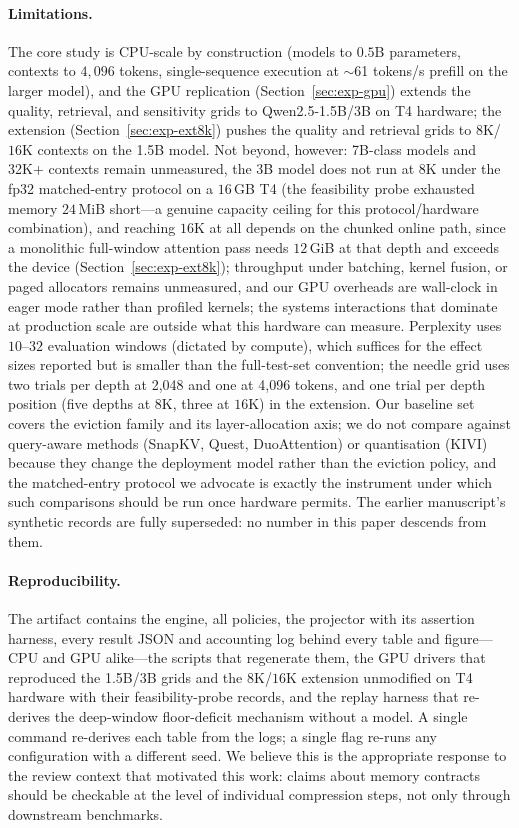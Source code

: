 \paragraph{Limitations.}
The core study is CPU-scale by construction (models to $0.5$B parameters,
contexts to $4{,}096$ tokens, single-sequence execution at
$\sim$61 tokens/s prefill on the larger model), and the GPU replication
(Section~\ref{sec:exp-gpu}) extends the quality, retrieval, and
sensitivity grids to Qwen2.5-1.5B/3B on T4 hardware; the extension
(Section~\ref{sec:exp-ext8k}) pushes the quality and retrieval grids to
$8$K/$16$K contexts on the 1.5B model. Not beyond, however: 7B-class
models and 32K+ contexts remain unmeasured, the 3B model does not run
at $8$K under the fp32 matched-entry protocol on a $16$\,GB T4 (the
feasibility probe exhausted memory $24$\,MiB short---a genuine capacity
ceiling for this protocol/hardware combination), and reaching $16$K at
all depends on the chunked online path, since a monolithic full-window
attention pass needs $12$\,GiB at that depth and exceeds the device
(Section~\ref{sec:exp-ext8k}); throughput under
batching, kernel fusion, or paged allocators remains unmeasured, and our
GPU overheads are wall-clock in eager mode rather than profiled kernels;
the systems interactions that dominate at production scale
\cite{kwon2023paged,mao2026infra} are outside what this hardware can
measure. Perplexity uses $10$--$32$ evaluation windows (dictated by
compute), which suffices for the effect sizes reported but is smaller
than the full-test-set convention; the needle grid uses two trials per
depth at 2{,}048 and one at 4{,}096 tokens, and one trial per depth
position (five depths at $8$K, three at $16$K) in the extension. Our
baseline set covers the
eviction family and its layer-allocation axis; we do not compare against
query-aware methods (SnapKV, Quest, DuoAttention) or quantisation (KIVI)
because they change the deployment model rather than the eviction policy,
and the matched-entry protocol we advocate is exactly the instrument
under which such comparisons should be run once hardware permits. The
earlier manuscript's synthetic records are fully superseded: no number in
this paper descends from them.

\paragraph{Reproducibility.}
The artifact contains the engine, all policies, the projector with its
assertion harness, every result JSON and accounting log behind every
table and figure---CPU and GPU alike---the scripts that regenerate them,
the GPU drivers that reproduced the 1.5B/3B grids and the $8$K/$16$K
extension unmodified on T4 hardware with their feasibility-probe
records, and the replay harness that re-derives the deep-window
floor-deficit mechanism without a model. A single command re-derives
each table from the logs; a single
flag re-runs any configuration with a different seed. We believe this is
the appropriate response to the review context that motivated this work:
claims about memory contracts should be checkable at the level of
individual compression steps, not only through downstream benchmarks.
